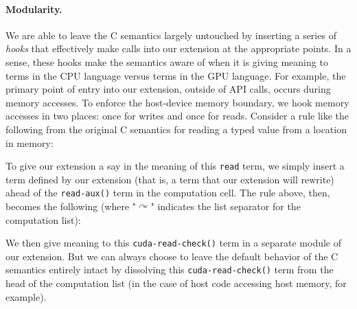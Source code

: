 \paragraph{Modularity.} 
We are able to leave the C semantics largely untouched by inserting a series of
{\em hooks} that effectively make calls into our extension at the appropriate
points. In a sense, these hooks make the semantics aware of when it is giving
meaning to terms in the CPU language versus terms in the GPU language. For
example, the primary point of entry into our extension, outside of API calls,
occurs during memory accesses. To enforce the host-device memory boundary, we
hook memory accesses in two places: once for writes and once for reads. Consider
a rule like the following from the original C semantics for reading a typed
value from a location in memory:

\vspace{0.5em}
{\footnotesize
{}
}

\noindent To give our extension a say in the meaning of this {\tt read} term, we simply
insert a term defined by our extension (that is, a term that our extension will
rewrite) ahead of the {\tt read-aux()} term in the computation cell. 
The rule above, then, becomes the following (where "$\curvearrowright$"
indicates the list separator for the computation list):

\vspace{0.5em}
{\footnotesize
{}
}

We then give meaning to this {\tt cuda-read-check()} term in a separate module
of our extension. But we can always choose to leave the default behavior of the
C semantics entirely intact by dissolving this {\tt cuda-read-check()} term from
the head of the computation list (in the case of host code accessing host
memory, for example). 

